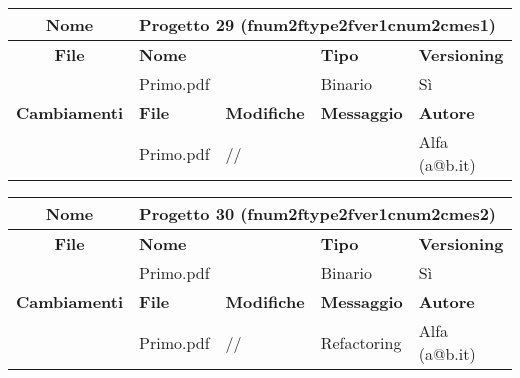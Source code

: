 \begin{table}[ht]
\footnotesize
\begin{tabular}{|c|p{2.5cm}|p{2cm}|p{2.5cm}|p{2.5cm}|}
  \hline
  \textbf{Nome}	& \multicolumn{4}{l|}{Progetto 29 (fnum2ftype2fver1cnum2cmes1)} 									\\
  \hline
  \rowcolor{lightgray}\textbf{File} 		& \multicolumn{2}{l|}{\textbf{Nome}}		& \textbf{Tipo}		& \textbf{Versioning} 		\\
						\cline{2-5}
						& \multicolumn{2}{l|}{Primo.pdf}		& Binario		& Sì				\\
  \hline
  \rowcolor{lightgray}\textbf{Cambiamenti}	& \textbf{File}		&\textbf{Modifiche}	& \textbf{Messaggio}	& \textbf{Autore}		\\
						\cline{2-5}
						& Primo.pdf		& //	 		& 			& Alfa (a@b.it)			\\
						
  \hline
\end{tabular}
\end{table}


\begin{table}[ht]
\footnotesize
\begin{tabular}{|c|p{2.5cm}|p{2cm}|p{2.5cm}|p{2.5cm}|}
  \hline
  \textbf{Nome}	& \multicolumn{4}{l|}{Progetto 30 (fnum2ftype2fver1cnum2cmes2)} 									\\
  \hline
  \rowcolor{lightgray}\textbf{File} 		& \multicolumn{2}{l|}{\textbf{Nome}}		& \textbf{Tipo}		& \textbf{Versioning} 		\\
						\cline{2-5}
						& \multicolumn{2}{l|}{Primo.pdf}		& Binario		& Sì				\\
  \hline
  \rowcolor{lightgray}\textbf{Cambiamenti}	& \textbf{File}		&\textbf{Modifiche}	& \textbf{Messaggio}	& \textbf{Autore}		\\
												\cline{2-5}
						& Primo.pdf		& //	 		& Refactoring		& Alfa (a@b.it)			\\
						
  \hline
\end{tabular}
\end{table}



